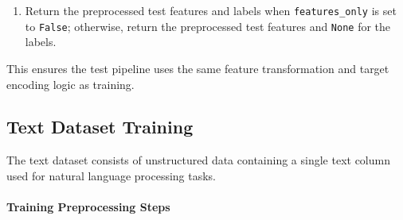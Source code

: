 \begin{enumerate}
    \begin{itemize}
      \item For classification, fill missing labels with the training-mode value, then apply the saved label encoder.
      \item For regression, fill missing values with the training median, then apply the saved standard scaler.
    \end{itemize}
\item Return the preprocessed test features and labels when \texttt{features\_only} is set to \texttt{False}; otherwise, return the preprocessed test features and \texttt{None} for the labels.
\end{enumerate}

This ensures the test pipeline uses the same feature transformation and target encoding logic as training.
\begin{table}[!htbp]
\centering
\small
\renewcommand{\arraystretch}{1.15}
\setlength{\tabcolsep}{4pt}

\caption{Classical Testing Data Preprocessing Parameters}
\label{tab:classicaltestingparams}

\end{table}

\subsection{Text Dataset Training}

The text dataset consists of unstructured data containing a single text column used for natural language processing tasks.

\vspace{1cm}
\paragraph{Training Preprocessing Steps}\par

